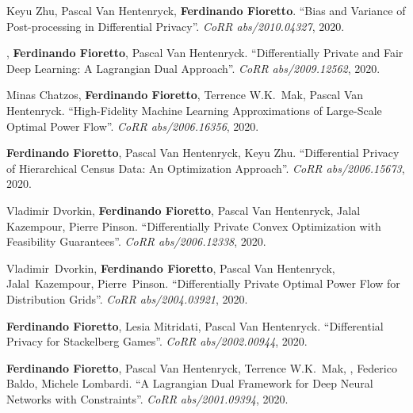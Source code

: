 \item Keyu Zhu, Pascal Van Hentenryck, {\bf Ferdinando Fioretto}.
{``Bias and Variance of Post-processing in Differential Privacy''}.
\emph{CoRR abs/2010.04327}, 2020.


\item {}, {\bf Ferdinando Fioretto}, Pascal Van Hentenryck.
{``Differentially Private and Fair Deep Learning: A Lagrangian Dual Approach''}.
\emph{CoRR abs/2009.12562}, 2020.

\item Minas Chatzos, {\bf Ferdinando Fioretto}, Terrence W.K.~Mak, Pascal Van Hentenryck.
{``High-Fidelity Machine Learning Approximations of Large-Scale Optimal Power Flow''}. 
\emph{CoRR abs/2006.16356}, 2020.

\item {\bf Ferdinando Fioretto}, Pascal Van Hentenryck, Keyu Zhu.
{``Differential Privacy of Hierarchical Census Data: An Optimization Approach''}. 
\emph{CoRR abs/2006.15673}, 2020.

\item Vladimir Dvorkin, {\bf Ferdinando Fioretto}, Pascal Van Hentenryck, Jalal Kazempour, Pierre Pinson.
{``Differentially Private Convex Optimization with Feasibility Guarantees''}. 
\emph{CoRR abs/2006.12338}, 2020.

\item Vladimir~Dvorkin, {\bf Ferdinando Fioretto}, Pascal Van Hentenryck, Jalal~Kazempour, Pierre~Pinson.
{``Differentially Private Optimal Power Flow for Distribution Grids''}. 
\emph{CoRR abs/2004.03921}, 2020.

\item {\bf Ferdinando Fioretto}, Lesia Mitridati, Pascal Van Hentenryck. 
{``Differential Privacy for Stackelberg Games''}. 
\emph{CoRR abs/2002.00944}, 2020. 

\item {\bf Ferdinando Fioretto}, Pascal Van Hentenryck, Terrence W.K.~Mak,
, Federico Baldo, Michele Lombardi. 
{``A Lagrangian Dual Framework for Deep Neural Networks with Constraints''}. 
\emph{CoRR abs/2001.09394}, 2020. 

